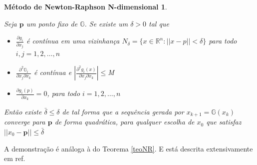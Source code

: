 \newtheorem*{dfNRnd}{Método de Newton-Raphson N-dimensional}
\begin{dfNRnd}
    \begin{prop}
    Seja $\mathbf{p}$ um ponto fixo de \(\mathbb{G}\). Se existe um \(\delta > 0\) tal que

    \begin{itemize} %
        \item[i)] $\frac{\partial g_i}{\partial x_j}$ é contínua em uma vizinhança $N_{\delta} = \{x \in \mathbb{R}^n : ||x - p|| < \delta\}$ para todo $i, j = 1, 2, \ldots, n$
        \item [ii)] $\frac{\partial^2 \mathbb{G}_i}{\partial x_j \partial x_k}$ é contínua e $|\frac{\partial^2g_i(x)}{\partial x_j \partial x_k}| \leq $M$ $
        \item [iii)] $\frac{\partial g_i(p)}{\partial x_k} = 0$, para todo $i = 1,2, \ldots, n$
    \end{itemize}
    Então existe \(\bar{\delta} \leq \delta\) de tal forma que a sequência gerada por $x_{k+1} = \mathbb{G}(x_{k})$ converge para $\mathbf{p}$ de forma quadrática, para qualquer escolha de $x_{0}$ que satisfaz \(|| x_{0} - \mathbf{p} || \leq \bar{\delta}\)
    \end{prop}

\end{dfNRnd}
A demonstração é análoga à do Teorema \ref{teoNR}. E está descrita extensivamente em ref.

